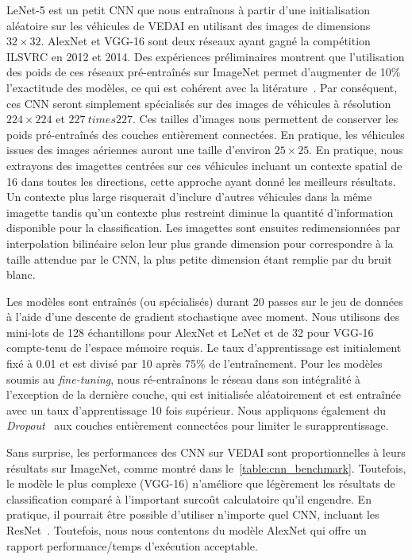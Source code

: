  LeNet-5 est un petit \gls{CNN} que nous entraînons à partir d'une initialisation aléatoire sur les véhicules de \gls{VEDAI} en utilisant des images de dimensions $32\times32$. AlexNet et VGG-16 sont deux réseaux ayant gagné la compétition \gls{ILSVRC} en 2012 et 2014. Des expériences préliminaires montrent que l'utilisation des poids de ces réseaux pré-entraînés sur ImageNet permet d'augmenter de 10\% l'exactitude des modèles, ce qui est cohérent avec la litérature~\cite{nogueira_towards_2016,penatti_deep_2015}. Par conséquent, ces \gls{CNN} seront simplement spécialisés sur des images de véhicules à résolution $224 \times 224$ et $227 \ times 227$. Ces tailles d'images nous permettent de conserver les poids pré-entraînés des couches entièrement connectées. En pratique, les véhicules issues des images aériennes auront une taille d'environ $25\times 25$. En pratique, nous extrayons des imagettes centrées sur ces véhicules incluant un contexte spatial de \SI{16}{\px} dans toutes les directions, cette approche ayant donné les meilleurs résultats. Un contexte plus large risquerait d'inclure d'autres véhicules dans la même imagette tandis qu'un contexte plus restreint diminue la quantité d'information disponible pour la classification. Les imagettes sont ensuites redimensionnées par interpolation bilinéaire selon leur plus grande dimension pour correspondre à la taille attendue par le \gls{CNN}, la plus petite dimension étant remplie par du bruit blanc.

Les modèles sont entraînés (ou spécialisés) durant 20 passes sur le jeu de données à l'aide d'une descente de gradient stochastique avec moment. Nous utilisons des mini-lots de 128 échantillons pour AlexNet et LeNet et de 32 pour VGG-16 compte-tenu de l'espace mémoire requis. Le taux d'apprentissage est initialement fixé à 0.01 et est divisé par 10 après 75\% de l'entraînement. Pour les modèles soumis au \emph{fine-tuning}, nous ré-entraînons le réseau dans son intégralité à l'exception de la dernière couche, qui est initialisée aléatoirement et est entraînée avec un taux d'apprentissage 10 fois supérieur. Nous appliquons également du \emph{Dropout}~\cite{srivastava_dropout:_2014} aux couches entièrement connectées pour limiter le surapprentissage.

Sans surprise, les performances des \gls{CNN} sur \gls{VEDAI} sont proportionnelles à leurs résultats sur ImageNet, comme montré dans le~\cref{table:cnn_benchmark}. Toutefois, le modèle le plus complexe (VGG-16) n'améliore que légèrement les résultats de classification comparé à l'important surcoût calculatoire qu'il engendre. En pratique, il pourrait être possible d'utiliser n'importe quel \gls{CNN}, incluant les ResNet~\cite{he_deep_2016}. Toutefois, nous nous contentons du modèle AlexNet qui offre un rapport performance/temps d'exécution acceptable.

